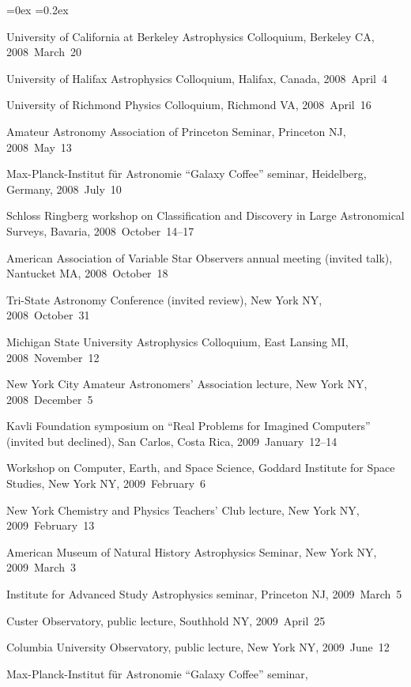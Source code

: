 \documentclass[12pt,letterpaper]{article}
\newcounter{refpubnum}
\newcommand{\hogglist}{%
    \rightmargin=0in
    \leftmargin=0.18in
    \topsep=0ex
    \partopsep=0pt
    \itemsep=0.2ex
    \parsep=0pt
    \itemindent=-1.0\leftmargin
    \listparindent=0.0\leftmargin
    \settowidth{\labelsep}{~}
    \usecounter{refpubnum}
  }
\begin{document}
\begin{list}{}{\hogglist}
{\item University of California at Berkeley Astrophysics Colloquium,
          Berkeley CA, 2008~March~20
\item University of Halifax Astrophysics Colloquium,
          Halifax, Canada, 2008~April~4
\item University of Richmond Physics Colloquium,
          Richmond VA, 2008~April~16
\item Amateur Astronomy Association of Princeton Seminar,
          Princeton NJ, 2008~May~13
\item Max-Planck-Institut f\"ur Astronomie ``Galaxy Coffee'' seminar,
          Heidelberg, Germany,
          2008~July~10
\item Schloss Ringberg workshop on Classification and Discovery
          in Large Astronomical Surveys, Bavaria,
          2008~October~14--17
\item American Association of Variable Star Observers annual meeting
          (invited talk), Nantucket MA, 2008~October~18
\item Tri-State Astronomy Conference (invited review),
          New York NY, 2008~October~31
\item Michigan State University Astrophysics Colloquium,
          East Lansing MI, 2008~November~12
\item New York City Amateur Astronomers' Association lecture,
          New York NY, 2008~December~5
\item Kavli Foundation symposium on ``Real Problems for Imagined Computers''
          (invited but declined), San Carlos, Costa Rica, 2009~January~12--14
\item Workshop on Computer, Earth, and Space Science,
          Goddard Institute for Space Studies, New York NY, 2009~February~6
\item New York Chemistry and Physics Teachers' Club lecture,
          New York NY, 2009~February~13
\item American Museum of Natural History Astrophysics Seminar,
          New York NY, 2009~March~3
\item Institute for Advanced Study Astrophysics seminar,
          Princeton NJ, 2009~March~5
\item Custer Observatory, public lecture,
          Southhold NY, 2009~April~25
\item Columbia University Observatory, public lecture,
          New York NY, 2009~June~12
\item Max-Planck-Institut f\"ur Astronomie ``Galaxy Coffee'' seminar,
}
\end{list}
\end{document}
